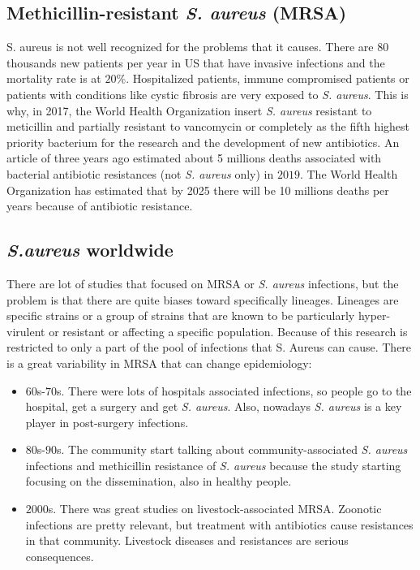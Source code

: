     \subsection{Methicillin-resistant \emph{S. aureus} (MRSA)}
    S. aureus is not well recognized for the problems that it causes.
    There are 80 thousands new patients per year in US that have invasive infections and the mortality rate is at $20\%$.
    Hospitalized patients, immune compromised patients or patients with conditions like cystic fibrosis are very exposed to \emph{S. aureus}.
    This is why, in 2017, the World Health Organization insert \emph{S. aureus} resistant to meticillin and partially resistant to vancomycin or completely as the fifth highest priority bacterium for the research and the development of new antibiotics.
    An article of three years ago estimated about 5 millions deaths associated with bacterial antibiotic resistances (not \emph{S. aureus} only) in $2019$.
    The World Health Organization has estimated that by 2025 there will be 10 millions deaths per years because of antibiotic resistance.

    \subsection{\emph{S.aureus} worldwide}
    There are lot of studies that focused on MRSA or \emph{S. aureus} infections, but the problem is that there are quite biases toward specifically lineages.
    Lineages are specific strains or a group of strains that are known to be particularly hyper-virulent or resistant or affecting a specific population.
    Because of this research is restricted to only a part of the pool of infections that S. Aureus can cause.
    There is a great variability in MRSA that can change epidemiology:

    \begin{multicols}{2}
        \begin{itemize}
            \item $60$s-$70$s. There were lots of hospitals associated infections, so people go to the hospital, get a surgery and get \emph{S. aureus}.
                Also, nowadays \emph{S. aureus} is a key player in post-surgery infections.
            \item $80$s-$90$s. The community start talking about community-associated \emph{S. aureus} infections and methicillin resistance of \emph{S. aureus} because the study starting focusing on the dissemination, also in healthy people.
            \item $2000$s. There was great studies on livestock-associated MRSA.
                Zoonotic infections are pretty relevant, but treatment with antibiotics cause resistances in that community.
                Livestock diseases and resistances are serious consequences.
        \end{itemize}
    \end{multicols}

